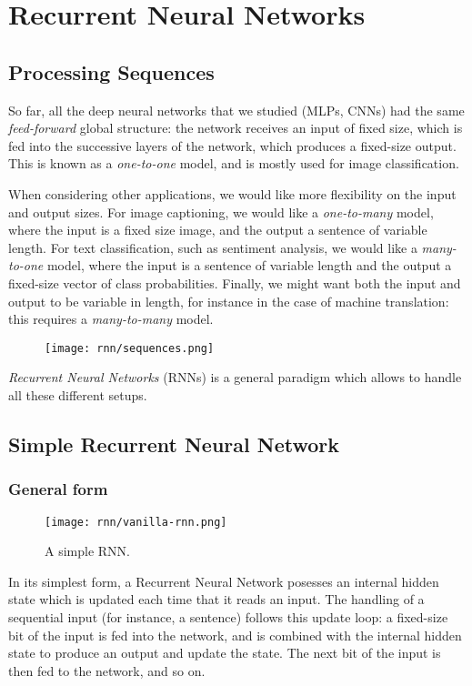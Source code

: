 \section{Recurrent Neural Networks}
\subsection{Processing Sequences}
So far, all the deep neural networks that we studied (MLPs, CNNs) had the same \emph{feed-forward} global structure: the network receives an input of fixed size, which is fed into the successive layers of the network, which produces a fixed-size output. This is known as a \emph{one-to-one} model, and is mostly used for image classification.

When considering other applications, we would like more flexibility on the input and output sizes. For image captioning, we would like a \emph{one-to-many} model, where the input is a fixed size image, and the output a sentence of variable length. For text classification, such as sentiment analysis, we would like a \emph{many-to-one} model, where the input is a sentence of variable length and the output a fixed-size vector of class probabilities. Finally, we might want both the input and output to be variable in length, for instance in the case of machine translation: this requires a \emph{many-to-many} model.

\begin{figure}[H]
    \centering
    \texttt{[image: rnn/sequences.png]}
\end{figure}

\emph{Recurrent Neural Networks} (RNNs) is a general paradigm which allows to handle all these different setups.

\subsection{Simple Recurrent Neural Network}
\subsubsection{General form}
\begin{wrapfigure}{r}{0.2\textwidth}
    \centering
    \texttt{[image: rnn/vanilla-rnn.png]}
    \caption{A simple RNN.}
\end{wrapfigure}
In its simplest form, a Recurrent Neural Network posesses an internal hidden state which is updated each time that it reads an input. The handling of a sequential input (for instance, a sentence) follows this update loop: a fixed-size bit of the input is fed into the network, and is combined with the internal hidden state to produce an output and update the state. The next bit of the input is then fed to the network, and so on. 

